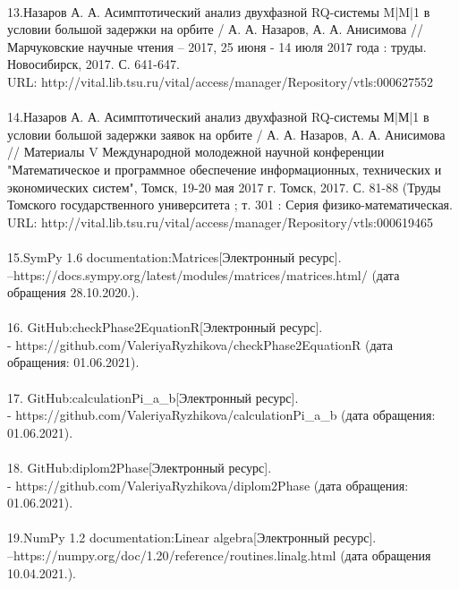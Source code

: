 \\
13.Назаров А. А. Асимптотический анализ двухфазной RQ-системы M|M|1 в условии большой задержки на орбите / А. А. Назаров, А. А. Анисимова // Марчуковские научные чтения – 2017, 25 июня - 14 июля 2017 года : труды. Новосибирск, 2017. С. 641-647.\\ URL: http://vital.lib.tsu.ru/vital/access/manager/Repository/vtls:000627552\\
\\
14.Назаров А. А. Асимптотический анализ двухфазной RQ-системы М|М|1 в условии большой задержки заявок на орбите / А. А. Назаров, А. А. Анисимова // Материалы V Международной молодежной научной конференции "Математическое и программное обеспечение информационных, технических и экономических систем", Томск, 19-20 мая 2017 г. Томск, 2017. С. 81-88 (Труды Томского государственного университета ; т. 301 : Серия физико-математическая. \\URL: http://vital.lib.tsu.ru/vital/access/manager/Repository/vtls:000619465\\
\\
15.SymPy 1.6 documentation:Matrices[Электронный ресурс].\\ –https://docs.sympy.org/latest/modules/matrices/matrices.html/  (дата обращения 28.10.2020.).\\
\\
16. GitHub:checkPhase2EquationR[Электронный ресурс].\\-  https://github.com/ValeriyaRyzhikova/checkPhase2EquationR (дата обращения: 01.06.2021).\\
\\
17. GitHub:calculationPi\_a\_b[Электронный ресурс].\\-  https://github.com/ValeriyaRyzhikova/calculationPi\_a\_b (дата обращения: 01.06.2021).\\
\\
18. GitHub:diplom2Phase[Электронный ресурс].\\- https://github.com/ValeriyaRyzhikova/diplom2Phase (дата обращения: 01.06.2021).\\
\\
19.NumPy 1.2 documentation:Linear algebra[Электронный ресурс].\\ –https://numpy.org/doc/1.20/reference/routines.linalg.html  (дата обращения 10.04.2021.).\\